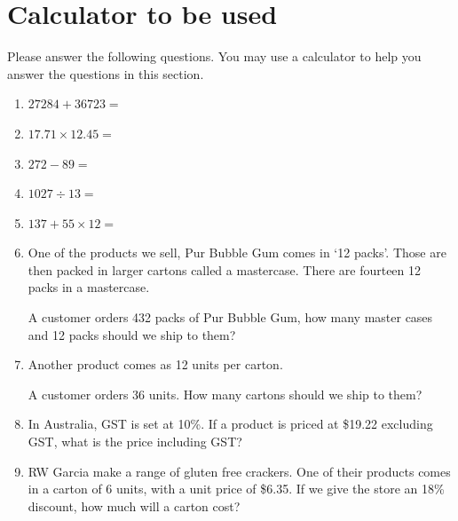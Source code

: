 \documentclass[a4paper]{article}
\begin{document}
\section{Calculator to be used}
Please answer the following questions. You may use a calculator to help you answer the questions in this section.
\begin{enumerate}\addtolength{\itemsep}{1\baselineskip}

\item \begin{math} 27284 + 36723 = \end{math} 
\item \begin{math} 17.71 \times 12.45 = \end{math} 
\item \begin{math} 272 - 89 = \end{math} 
\item \begin{math} 1027 \div 13 = \end{math} 
\item \begin{math} 137 + 55 \times 12 = \end{math}  
\item One of the products we sell, Pur Bubble Gum comes in `12 packs'. Those are then packed in larger cartons called a mastercase.
  There are fourteen 12 packs in a mastercase.
  

  A customer orders 432 packs of Pur Bubble Gum, how many master cases and 12 packs should we ship to them?
  
  
\item Another product comes as 12 units per carton. 

A customer orders 36 units. How many cartons should we ship to them?


\item In Australia, GST is set at 10\%. If a product is priced at \$19.22 excluding GST, what is the price including GST?


\item RW Garcia make a range of gluten free crackers. One of their products comes in a carton of 6 units, with a unit price of \$6.35.
  If we give the store an 18\% discount, how much will a carton cost?


\end{enumerate}
\end{document}
